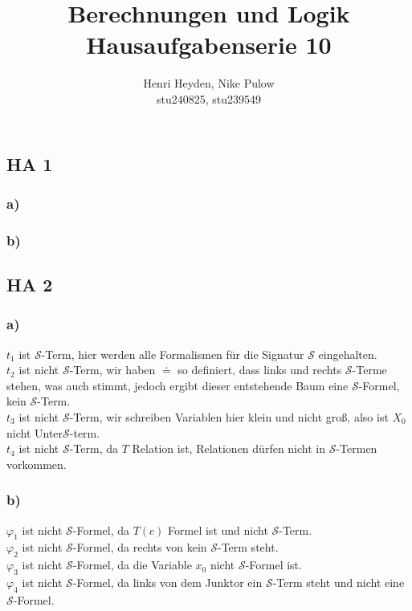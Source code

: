 \documentclass[12pt, a4paper]{article}
\title{Berechnungen und Logik\\Hausaufgabenserie 10}
\author{Henri Heyden, Nike Pulow \\ \small stu240825, stu239549}
\date{}
\begin{document}
\maketitle

\doublespacing
\vspace*{-2cm}
\subsection*{HA 1}
\subsubsection*{a)}
\subsubsection*{b)}
\subsection*{HA 2}
\subsubsection*{a)}
\(t_1\) ist \(\mathcal S\)-Term, hier werden alle Formalismen für die Signatur \(\mathcal S\) eingehalten. \\
\(t_2\) ist nicht \(\mathcal S\)-Term, wir haben \(\doteq\) so definiert, dass links und rechts \(\mathcal S\)-Terme stehen, was auch stimmt, jedoch ergibt dieser entstehende Baum eine \(\mathcal S\)-Formel, kein \(\mathcal S\)-Term. \\
\(t_3\) ist nicht \(\mathcal S\)-Term, wir schreiben Variablen hier klein und nicht groß, also ist \(X_0\) nicht Unter\(\mathcal S\)-term. \\
\(t_4\) ist nicht \(\mathcal S\)-Term, da \(T\) Relation ist, Relationen dürfen nicht in \(\mathcal S\)-Termen vorkommen.
\subsubsection*{b)}
\(\varphi_1\) ist nicht \(\mathcal S\)-Formel, da \(T(c)\) Formel ist und nicht \(\mathcal S\)-Term. \\
\(\varphi_2\) ist nicht \(\mathcal S\)-Formel, da rechts von \textquote{\(\doteq\)} kein \(\mathcal S\)-Term steht. \\
\(\varphi_3\) ist nicht \(\mathcal S\)-Formel, da die Variable \(x_0\) nicht \(\mathcal S\)-Formel ist. \\
\(\varphi_4\) ist nicht \(\mathcal S\)-Formel, da links von dem Junktor \textquote{\(\wedge\)} ein \(\mathcal S\)-Term steht und nicht eine \(\mathcal S\)-Formel.
\end{document}
